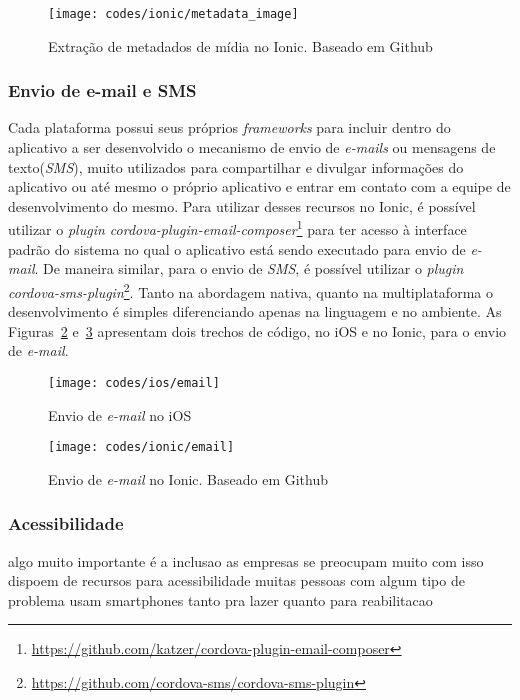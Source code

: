 \begin{figure}[H]
	\centering
	\texttt{[image: codes/ionic/metadata\_image]}
	\caption[Extração de metadados de mídia no Ionic]{Extração de metadados de mídia no Ionic. Baseado em Github\protect\footnotemark}
	\label{fig:metadata_image-ionic}
\end{figure}

\subsubsection{Envio de e-mail e SMS} \label{subsubsec:emailsms}
Cada plataforma possui seus próprios \textit{frameworks} para incluir dentro do aplicativo a ser desenvolvido o mecanismo de envio de \textit{e-mails} ou mensagens de texto(\textit{SMS}), muito utilizados para compartilhar 
e divulgar informações do aplicativo ou até mesmo o próprio aplicativo e entrar em contato com a equipe de desenvolvimento do mesmo. Para utilizar desses recursos no Ionic, é possível utilizar o 
\textit{plugin cordova-plugin-email-composer}\footnote{\url{https://github.com/katzer/cordova-plugin-email-composer}} para ter acesso à interface padrão do sistema no qual o aplicativo está sendo executado para envio de 
\textit{e-mail}. De maneira similar, para o envio de \textit{SMS}, é possível utilizar o \textit{plugin cordova-sms-plugin}\footnote{\url{https://github.com/cordova-sms/cordova-sms-plugin}}. Tanto na abordagem nativa, 
quanto na multiplataforma o desenvolvimento é simples diferenciando apenas na linguagem e no ambiente. As Figuras~\ref{fig:email-ios} e~\ref{fig:email-ionic} apresentam dois trechos de código, no iOS e no Ionic, 
para o envio de \textit{e-mail}.
\begin{figure}[H]
	\centering
	\texttt{[image: codes/ios/email]}
	\caption[Envio de \textit{e-mail} no iOS]{Envio de \textit{e-mail} no iOS}
	\label{fig:email-ios}
\end{figure}
\begin{figure}[H]
	\centering
	\texttt{[image: codes/ionic/email]}
	\caption[Envio de \textit{e-mail} no Ionic]{Envio de \textit{e-mail} no Ionic. Baseado em Github\protect\footnotemark}
	\label{fig:email-ionic}
\end{figure}

\subsubsection{Acessibilidade} \label{subsubsec:acessibilidade}
algo muito importante é a inclusao
as empresas se preocupam muito com isso
dispoem de recursos para acessibilidade
muitas pessoas com algum tipo de problema usam smartphones tanto pra lazer quanto para reabilitacao

